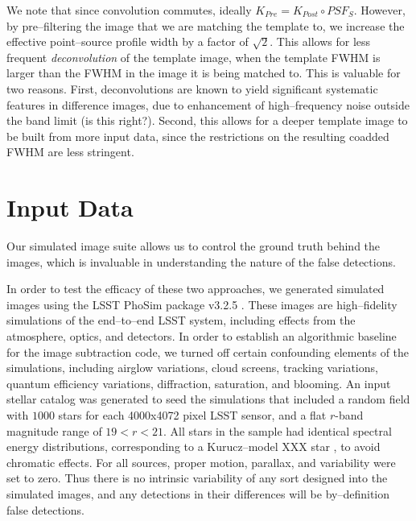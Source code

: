 \documentclass[floatfix, apj]{emulateapj}
\begin{document}
We note that since convolution commutes, ideally $K_{Pre} = K_{Post} \circ PSF_S$.
However, by pre--filtering the image that we are matching the template to, we increase the effective point--source profile width by a factor of $\sqrt{2}$.
This allows for less frequent {\it deconvolution} of the template image, when the template FWHM is larger than the FWHM in the image it is being matched to.
This is valuable for two reasons.
First, deconvolutions are known to yield significant systematic features in difference images, due to enhancement of high--frequency noise outside the band limit (is this right?).
Second, this allows for a deeper template image to be built from more input data, since the restrictions on the resulting coadded FWHM are less stringent.


\section{Input Data}

Our simulated image suite allows us to control the ground truth behind the images, which is invaluable in understanding the nature of the false detections.

In order to test the efficacy of these two approaches, we generated simulated images using the LSST PhoSim package v3.2.5 \cite{phosim}.
These images are high--fidelity simulations of the end--to--end LSST system, including effects from the atmosphere, optics, and detectors.
In order to establish an algorithmic baseline for the image subtraction code, we turned off certain confounding elements of the simulations, including airglow variations, cloud screens, tracking variations, quantum efficiency variations, diffraction, saturation, and blooming.
An input stellar catalog was generated to seed the simulations that included a random field with $1000$ stars for each 4000x4072 pixel LSST sensor, and a flat $r$-band magnitude range of $19<r<21$.
All stars in the sample had identical spectral energy distributions, corresponding to a Kurucz--model XXX star \cite{kurucz}, to avoid chromatic effects.
For all sources, proper motion, parallax, and variability were set to zero.
Thus there is no intrinsic variability of any sort designed into the simulated images, and any detections in their differences will be by--definition false detections.
\end{document}
